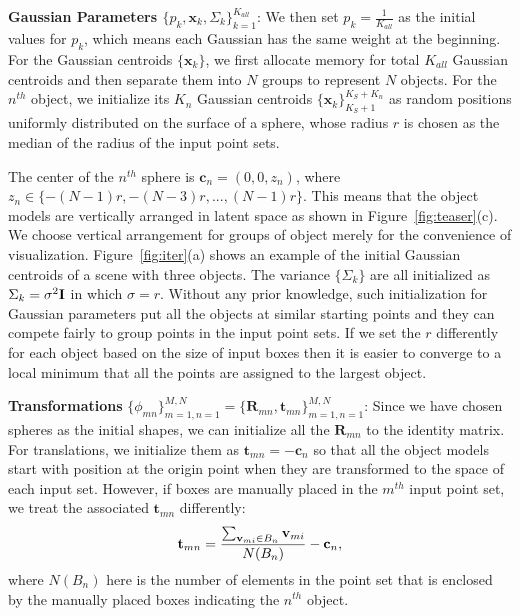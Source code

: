 \noindent\textbf{Gaussian Parameters $\{p_k,\mathbf{x}_k,\Sigma_k\}_{k=1}^{K_{all}}$}:
We then set $p_k=\frac{1}{K_{all}}$ as the initial values for $p_k$, which means each Gaussian has the same weight at the beginning. 
%
For the Gaussian centroids $\{\mathbf{x}_k\}$, we first allocate memory for total $K_{all}$ Gaussian centroids and then separate them into $N$ groups to represent $N$ objects. 
For the $n^{th}$ object, we initialize its $K_n$ Gaussian centroids $\{\mathbf{x}_k\}_{K_S+1}^{K_S+K_n}$ as random positions uniformly distributed on the surface of a sphere, whose radius $r$ is chosen as the median of the radius of the input point sets.
%
 
%
The center of the $n^{th}$ sphere is $\mathbf{c}_n=(0,0,z_n)$, where $z_n\in \{-(N-1)r,-(N-3)r,...,(N-1)r\}$.
%
This means that the object models are vertically arranged in latent space as shown in Figure~\ref{fig:teaser}(c). 
%
We choose vertical arrangement for groups of object merely for the convenience of visualization.
%
Figure~\ref{fig:iter}(a) shows an example of the initial Gaussian centroids of a scene with three objects.
%
The variance $\{\Sigma_k\}$ are all initialized as $\Sigma_k=\sigma^2 \mathbf{I}$ in which $\sigma=r$.
Without any prior knowledge, such initialization for Gaussian parameters put all the objects at similar starting points and they can compete fairly to group points in the input point sets. If we set the $r$ differently for each object based on the size of input boxes then it is easier to converge to a local minimum that all the points are assigned to the largest object.

\noindent\textbf{Transformations} $\{\phi_{mn}\}_{m=1,n=1}^{M,N}=\{\mathbf{R}_{mn},\mathbf{t}_{mn}\}_{m=1,n=1}^{M,N}$:
Since we have chosen spheres as the initial shapes, we can initialize all the $\mathbf{R}_{mn}$ to the identity matrix.
%
%
For translations, we initialize them as $\mathbf{t}_{mn}=- \mathbf{c}_n$ so that all the object models start with position at the origin point when they are transformed to the space of each input set. 
%
However, if boxes are manually placed in the $m^{th}$ input point set, we treat the associated $\mathbf{t}_{mn}$ differently:
%
\begin{equation}
	\label{equ:initt}
	\mathbf{t}_{mn}=\frac{\sum_{\mathbf{v}_{mi} \in B_n}\mathbf{v}_{mi}}{N(B_n)}-\mathbf{c}_n, 
\end{equation}
where $N(B_n)$ here is the number of elements in the point set that is enclosed by the manually placed boxes indicating the $n^{th}$ object.


